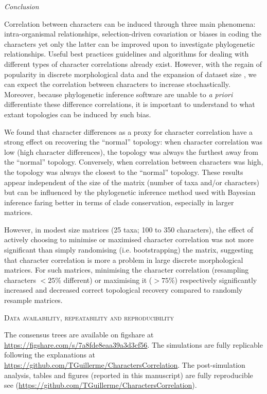 \documentclass[12pt,letterpaper]{article}
\renewcommand{\section}[1]{%
\bigskip
\begin{center}
\begin{Large}
\normalfont\scshape #1
\medskip
\end{Large}
\end{center}}
\renewcommand{\subsection}[1]{%
\bigskip
\begin{center}
\begin{large}
\normalfont\itshape #1
\end{large}
\end{center}}
\begin{document}
\subsection{Conclusion}
Correlation between characters can be induced through three main phenomena: intra-organismal relationships, selection-driven covariation or biases in coding the characters yet only the latter can be improved upon to investigate phylogenetic relationships.
Useful best practices guidelines \citep[e.g.][]{Brazeau2011,simoes2017giant} and algorithms for dealing with different types of character correlations \citep[e.g. for characters hierarchy][]{de2015parsimony,BrazeauNA} already exist.
However, with the regain of popularity in discrete morphological data and the expansion of dataset size \citep[e.g.][with more than 1000 characters each]{nithe2013,O'Leary08022013}, we can expect the correlation between characters to increase stochastically.
Moreover, because phylogenetic inference software are unable to \textit{a priori} differentiate these difference correlations, it is important to understand to what extant topologies can be induced by such bias.

We found that character differences as a proxy for character correlation have a strong effect on recovering the ``normal'' topology: when character correlation was low (high character differences), the topology was always the furthest away from the ``normal'' topology.
Conversely, when correlation between characters was high, the topology was always the closest to the ``normal'' topology.
These results appear independent of the size of the matrix (number of taxa and/or characters) but can be influenced by the phylogenetic inference method used with Bayesian inference faring better in terms of clade conservation, especially in larger matrices.

However, in modest size matrices (25 taxa; 100 to 350 characters), the effect of actively choosing to minimise or maximised character correlation was not more significant than simply randomising (i.e. bootstrapping) the matrix, suggesting that character correlation is more a problem in large discrete morphological matrices.
For such matrices, minimising the character correlation (resampling characters $<25$\% different) or maximising it ($>75$\%) respectively significantly increased and decreased correct topological recovery compared to randomly resample matrices.


\section{Data availability, repeatability and reproducibility}
The consensus trees are available on figshare at \url{https://figshare.com/s/7a8fde8eaa39a3d3cf56}.
The simulations are fully replicable following the explanations at \url{https://github.com/TGuillerme/CharactersCorrelation}.
The post-simulation analysis, tables and figures (reported in this manuscript) are fully reproducible see (\url{https://github.com/TGuillerme/CharactersCorrelation}).
\end{document}
